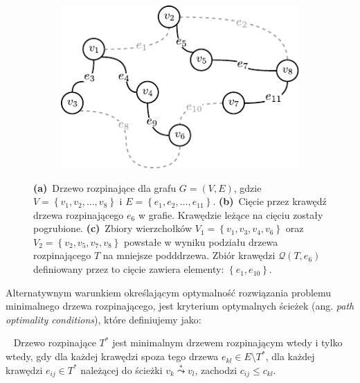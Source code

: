 \begin{figure}[!htbp]
\begin{subfigure}[b]{0.3\textwidth}
		\includegraphics[width=\textwidth]{Chapter_I/CUT-example/c}
		\caption{}
		\label{fig:cut:c}
	\end{subfigure}
	\hfill\null
	\caption{
		\textbf{(a)}~Drzewo rozpinające dla grafu $G = \left( V, E \right)$, gdzie $V = \left\{ v_{1}, v_{2}, \dots, v_{8} \right\}$ i $E = \left\{ e_{1}, e_{2}, \dots, e_{11} \right\}$.
		\textbf{(b)}~Cięcie przez krawędź drzewa rozpinającego $e_{6}$ w grafie. Krawędzie leżące na cięciu zostały pogrubione.
		\textbf{(c)}~Zbiory wierzchołków $V_{1} = \left\{ v_{1}, v_{3}, v_{4}, v_{6} \right\}$ oraz $V_{2} = \left\{ v_{2}, v_{5}, v_{7}, v_{8} \right\}$ powstałe w wyniku podziału drzewa rozpinającego $T$ na mniejsze podddrzewa. Zbiór krawędzi $\mathcal{Q} \left( T, e_{6} \right)$ definiowany przez to cięcie zawiera elementy: $\left\{ e_{1}, e_{10} \right\}$.
	}
	\label{fig:cut}
\end{figure}

Alternatywnym warunkiem określającym optymalność rozwiązania problemu minimalnego drzewa rozpinającego, jest kryterium optymalnych ścieżek (ang. \textit{path optimality conditions}), które definiujemy jako:

\begin{theorem}\label{def:optpath}~\cite[$519$]{Ahuja:1993:NFT:137406}
	Drzewo rozpinające $T^{\ast}$ jest minimalnym drzewem rozpinającym wtedy i tylko wtedy, gdy dla każdej krawędzi spoza tego drzewa $e_{kl} \in E \setminus T^{\ast}$, dla każdej krawędzi $e_{ij} \in T^{\ast}$ należącej do ścieżki $v_{k} \overset{\ast}{\leadsto} v_{l}$, zachodzi $c_{ij} \leqslant c_{kl}$.
\end{theorem}

